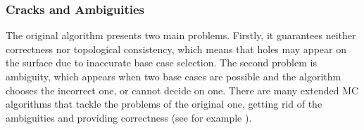 \subsubsection{Cracks and Ambiguities}
The original algorithm presents two main problems. Firstly, it guarantees neither correctness nor topological consistency, which means that holes may appear on the surface due to inaccurate base case selection. The second problem is ambiguity, which appears when two base cases are possible and the algorithm chooses the incorrect one, or cannot decide on one. There are many extended \ac{MC} algorithms that tackle the problems of the original one, getting rid of the ambiguities and providing correctness (see for example \cite{ExtendedMC}).
